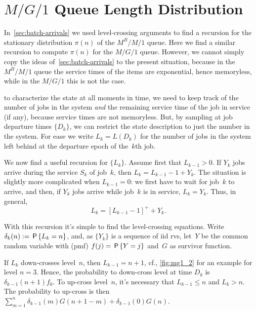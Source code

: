 \documentclass[stochastic-or.tex]{subfiles}
\begin{document}
\section{$M/G/1$ Queue Length Distribution}\label{sec:distr-queue-length}



In~\cref{sec:batch-arrivals} we used level-crossing arguments to find a recursion for the stationary distribution $\pi(n)$ of the $M^B/M/1$ queue.
Here we find a similar recursion to compute $\pi(n)$ for the  $M/G/1$ queue.
However, we cannot simply copy the ideas of~\cref{sec:batch-arrivals} to the present situation, because in the $M^B/M/1$ queue the service times of the items are exponential, hence memoryless, while in the $M/G/1$ this is not the case.




 to characterize the state at all moments in time, we need to keep track of the number of jobs in the system \emph{and} the remaining service time of the job in service (if any), because service times are not memoryless.
But, by sampling at job departure times $\{D_k\}$, we can restrict the state description to just the number in the system.
For ease we write $L_k=L(D_{k})$ for the number of jobs in the system left behind at the departure epoch of the~$k$th job.

We now find a useful recursion for $\{L_k\}$.
Assume first that $L_{k-1}>0$.
If $Y_{k}$ jobs arrive during the service $S_{k}$ of job~$k$, then $L_k=L_{k-1}-1 + Y_{k}$.
The situation is slightly more complicated when $L_{k-1}=0$: we first have to wait for job~$k$ to arrive, and then, if $Y_k$ jobs arrive while job~$k$ is in service,  $L_k=Y_{k}$.
Thus, in general,
\begin{equation*}
L_k=[L_{k-1}-1]^+ + Y_{k}.
\end{equation*}

With this recursion it's simple to find the level-crossing equations. Write $\delta_k(n) := \P{L_k=n}$, and,
as $\{Y_k\}$ is a sequence of iid rvs, let~$Y$ be the common random variable with (pmf) $f(j) = \P{Y = j}$ and~$G$ as survivor function.

If $L_{k}$ down-crosses level~$n$, then $L_{k-1}=n+1$, cf., \cref{fig:mg1_2} for an example for level $n=3$.
Hence, the probability to down-cross level at time $D_{k}$ is $\delta_{k-1}(n+1) f_{0}$. To up-cross level~$n$, it's necessary that $L_{k-1}\leq n$ and $L_k>n$.
The probability to up-cross is then $\sum_{m=1}^{n} \delta_{k-1}(m) G(n+1-m) + \delta_{k-1}(0) G(n)$.
\end{document}

